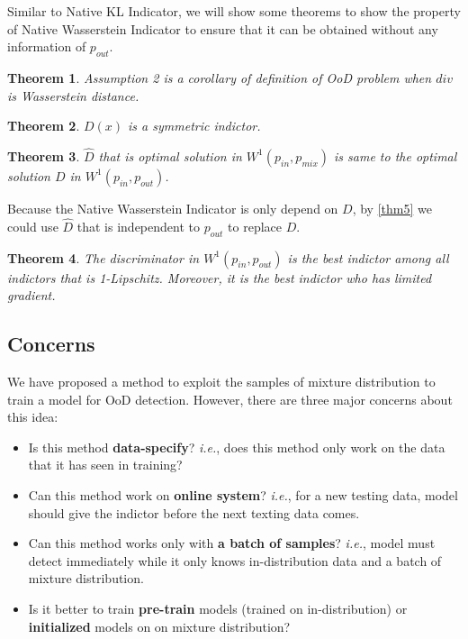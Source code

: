 \documentclass[letterpaper]{article} %
\newtheorem{theorem}{Theorem}
\newcommand{\IE}{\textit{i.e.}, }
\newcommand{\pin}{p_{in}}
\newcommand{\pout}{p_{out}}
\newcommand{\pmix}{p_{mix}}
\begin{document}
Similar to Native KL Indicator, we will show some theorems to show the property of Native Wasserstein Indicator to ensure that it can be obtained without any information of $\pout$. 

\begin{theorem}\label{thm6}
	Assumption 2 is a corollary of definition of OoD problem when $div$ is Wasserstein distance.  
\end{theorem}

\begin{theorem}\label{thm7}
	$D(x)$ is a symmetric indictor. 
\end{theorem}

\begin{theorem}\label{thm8}
	$\hat{D}$ that is optimal solution in $W^1(\pin, \pmix)$ is same to the optimal solution $D$ in $W^1(\pin, \pout)$. 
\end{theorem}

Because the Native Wasserstein Indicator is only depend on $D$, by \cref{thm5} we could use $\hat{D}$ that is independent to $\pout$ to replace $D$. 

\begin{theorem}\label{thm9}
	The discriminator in $W^1(\pin, \pout)$ is the best indictor among all indictors that is 1-Lipschitz. Moreover, it is the best indictor who has limited gradient. 
\end{theorem}

\subsection{Concerns}
We have proposed a method to exploit the samples of mixture distribution to train a model for OoD detection. However, there are three major concerns about this idea: 
\begin{itemize}
	\item Is this method \textbf{data-specify}? \IE does this method only work on the data that it has seen in training? 
	\item Can this method work on \textbf{online system}? \IE for a new testing data, model should give the indictor before the next texting data comes.  
	\item Can this method works only with \textbf{a batch of samples}? \IE model must detect immediately while it only knows in-distribution data and a batch of mixture distribution. 
	\item Is it better to train \textbf{pre-train} models (trained on in-distribution) or \textbf{initialized} models on on mixture distribution?
\end{itemize} 
\end{document}

